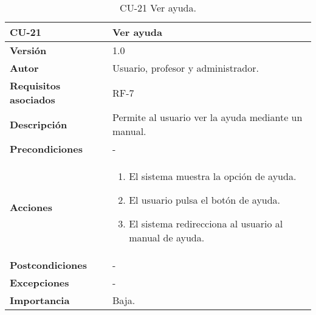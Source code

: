 \begin{table}[h!]
	\centering
	\begin{tabularx}{\linewidth}{ p{} p{} }
		\toprule
		\textbf{CU-21}    & \textbf{Ver ayuda}\\
		\toprule
		\textbf{Versión}              & 1.0    \\
		\textbf{Autor}                & Usuario, profesor y administrador. \\
		\textbf{Requisitos asociados} & RF-7\\
		\textbf{Descripción}          & Permite al usuario ver la ayuda mediante un manual. \\
		\textbf{Precondiciones}         & - \\
		\textbf{Acciones}             &
		\begin{enumerate}
			\def\labelenumi{\arabic{enumi}.}
			\tightlist
			\item El sistema muestra la opción de ayuda.
			\item El usuario pulsa el botón de ayuda.
            \item El sistema redirecciona al usuario al manual de ayuda.
		\end{enumerate}\\
         \textbf{Postcondiciones}             & - \\
		\textbf{Excepciones}             & - \\
		\textbf{Importancia}          & Baja. \\
		\bottomrule
	\end{tabularx}
	\caption{CU-21 Ver ayuda.}
\end{table}


